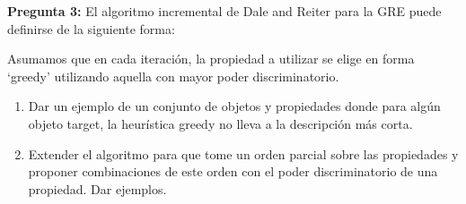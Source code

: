 \documentclass{article}
\begin{document}
\medskip
\textbf{Pregunta 3:} El algoritmo incremental de Dale and Reiter para la GRE puede definirse
de la siguiente forma:

\begin{center}
\end{center}

Asumamos que en cada iteraci\'on, la propiedad a utilizar se elige en forma `greedy' utilizando aquella con 
mayor poder discriminatorio.  

\begin{enumerate}
\item Dar un ejemplo de un conjunto de objetos y propiedades donde para alg\'un objeto 
target, la heur\'istica greedy no lleva a la descripci\'on m\'as corta. 
\item Extender el algoritmo para que tome un orden parcial sobre las propiedades y proponer combinaciones 
de este orden con el poder discriminatorio de una propiedad.  Dar ejemplos. 
\end{enumerate}
\end{document}
